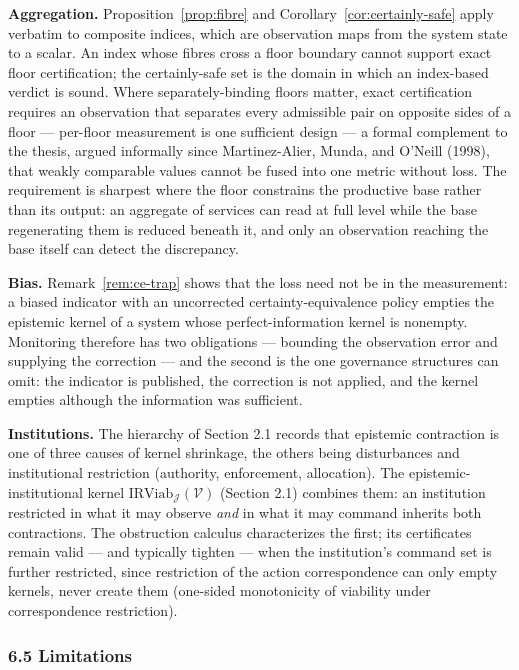 \documentclass[11pt]{article}
\theoremstyle{definition}
\begin{document}
\textbf{Aggregation.} Proposition~\ref{prop:fibre} and Corollary~\ref{cor:certainly-safe} apply verbatim to
composite indices, which are observation maps from the system state to a
scalar. An index whose fibres cross a floor boundary cannot support
exact floor certification; the certainly-safe set is the domain in which an index-based verdict is sound. Where separately-binding floors matter, exact
certification requires an observation that separates every admissible
pair on opposite sides of a floor --- per-floor measurement is one
sufficient design --- a formal complement to the thesis, argued informally since Martinez-Alier, Munda, and O'Neill (1998), that weakly comparable
values cannot be fused into one metric without loss. The requirement is
sharpest where the floor constrains the productive base rather than its
output: an aggregate of services can read at full level while the base
regenerating them is reduced beneath it, and only an observation
reaching the base itself can detect the discrepancy.

\textbf{Bias.} Remark~\ref{rem:ce-trap} shows that the loss need not be in the
measurement: a biased indicator with an uncorrected
certainty-equivalence policy empties the epistemic kernel of a system
whose perfect-information kernel is nonempty. Monitoring therefore has
two obligations --- bounding the observation error and supplying the
correction --- and the second is the one governance structures can omit: the indicator is published, the correction is not applied,
and the kernel empties although the information was sufficient.

\textbf{Institutions.} The hierarchy of Section 2.1 records that
epistemic contraction is one of three causes of kernel shrinkage, the
others being disturbances and institutional restriction (authority,
enforcement, allocation). The epistemic-institutional kernel \(\mathrm{IRViab}_{\mathcal{J}}(\mathcal{V})\) (Section 2.1) combines them: an institution restricted in what it
may observe \emph{and} in what it may command inherits both
contractions. The obstruction calculus characterizes the first; its
certificates remain valid --- and typically tighten --- when the
institution's command set is further restricted, since restriction of
the action correspondence can only empty kernels, never create them
(one-sided monotonicity of viability under correspondence restriction).

\subsubsection{6.5 Limitations}\label{limitations}
\end{document}

